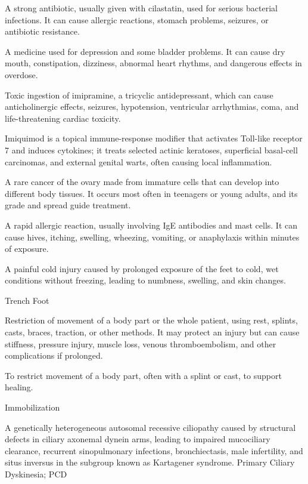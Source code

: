  A strong antibiotic, usually given with cilastatin, used for serious bacterial infections. It can cause allergic reactions, stomach problems, seizures, or antibiotic resistance.

 A medicine used for depression and some bladder problems. It can cause dry mouth, constipation, dizziness, abnormal heart rhythms, and dangerous effects in overdose.

 Toxic ingestion of imipramine, a tricyclic antidepressant, which can cause anticholinergic effects, seizures, hypotension, ventricular arrhythmias, coma, and life-threatening cardiac toxicity.

 Imiquimod is a topical immune-response modifier that activates Toll-like receptor 7 and induces cytokines; it treats selected actinic keratoses, superficial basal-cell carcinomas, and external genital warts, often causing local inflammation.

 A rare cancer of the ovary made from immature cells that can develop into different body tissues. It occurs most often in teenagers or young adults, and its grade and spread guide treatment.

 A rapid allergic reaction, usually involving IgE antibodies and mast cells. It can cause hives, itching, swelling, wheezing, vomiting, or anaphylaxis within minutes of exposure.

 A painful cold injury caused by prolonged exposure of the feet to cold, wet conditions without freezing, leading to numbness, swelling, and skin changes.

\synonyms
Trench Foot

 Restriction of movement of a body part or the whole patient, using rest, splints, casts, braces, traction, or other methods. It may protect an injury but can cause stiffness, pressure injury, muscle loss, venous thromboembolism, and other complications if prolonged.

 To restrict movement of a body part, often with a splint or cast, to support healing.

\synonyms
Immobilization

 A genetically heterogeneous autosomal recessive ciliopathy caused by structural defects in ciliary axonemal dynein arms, leading to impaired mucociliary clearance, recurrent sinopulmonary infections, bronchiectasis, male infertility, and situs inversus in the subgroup known as Kartagener syndrome.
\synonyms
Primary Ciliary Dyskinesia; PCD

